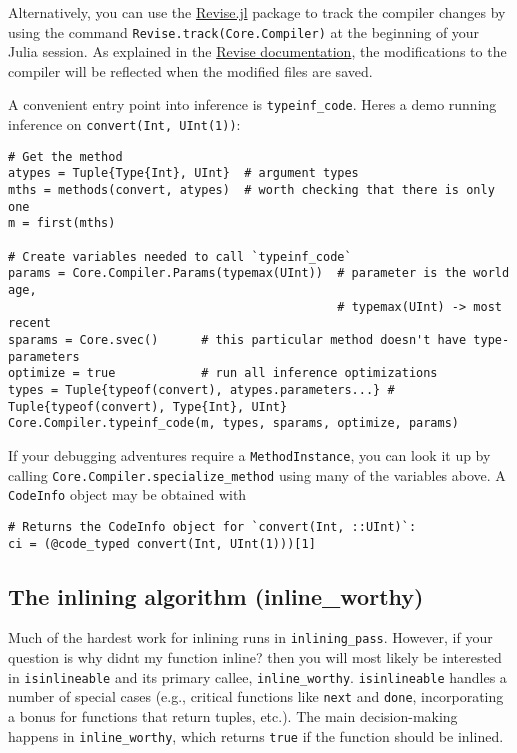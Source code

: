 Alternatively, you can use the \href{https://github.com/timholy/Revise.jl}{Revise.jl} package to track the compiler changes by using the command \texttt{Revise.track(Core.Compiler)} at the beginning of your Julia session. As explained in the \href{https://timholy.github.io/Revise.jl/stable/}{Revise documentation}, the modifications to the compiler will be reflected when the modified files are saved.



A convenient entry point into inference is \texttt{typeinf\_code}. Here{\textquotesingle}s a demo running inference on \texttt{convert(Int, UInt(1))}:




\begin{verbatim}
# Get the method
atypes = Tuple{Type{Int}, UInt}  # argument types
mths = methods(convert, atypes)  # worth checking that there is only one
m = first(mths)

# Create variables needed to call `typeinf_code`
params = Core.Compiler.Params(typemax(UInt))  # parameter is the world age,
                                              # typemax(UInt) -> most recent
sparams = Core.svec()      # this particular method doesn't have type-parameters
optimize = true            # run all inference optimizations
types = Tuple{typeof(convert), atypes.parameters...} # Tuple{typeof(convert), Type{Int}, UInt}
Core.Compiler.typeinf_code(m, types, sparams, optimize, params)
\end{verbatim}



If your debugging adventures require a \texttt{MethodInstance}, you can look it up by calling \texttt{Core.Compiler.specialize\_method} using many of the variables above. A \texttt{CodeInfo} object may be obtained with




\begin{verbatim}
# Returns the CodeInfo object for `convert(Int, ::UInt)`:
ci = (@code_typed convert(Int, UInt(1)))[1]
\end{verbatim}



\hypertarget{3650644351684738912}{}


\subsection{The inlining algorithm (inline\_worthy)}



Much of the hardest work for inlining runs in \texttt{inlining\_pass}. However, if your question is {\textquotedbl}why didn{\textquotesingle}t my function inline?{\textquotedbl} then you will most likely be interested in \texttt{isinlineable} and its primary callee, \texttt{inline\_worthy}. \texttt{isinlineable} handles a number of special cases (e.g., critical functions like \texttt{next} and \texttt{done}, incorporating a bonus for functions that return tuples, etc.). The main decision-making happens in \texttt{inline\_worthy}, which returns \texttt{true} if the function should be inlined.



